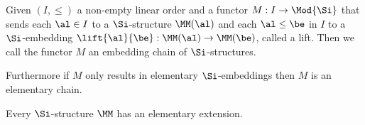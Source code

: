\begin{dfn}
    Given $(I,\leq)$ a non-empty linear order and a functor $M: I \to \Mod{\Si}$
    that sends each $\al \in I$ to a $\Si$-structure $\MM(\al)$
    and each $\al \leq \be$ in $I$ to a 
    $\Si$-embedding $\lift{\al}{\be} : \MM(\al) \to \MM(\be)$, called a lift.
    Then we call the functor $M$ an embedding chain of $\Si$-structures.

    Furthermore if $M$ only results in elementary $\Si$-embeddings
    then $M$ is an elementary chain.
\end{dfn}

\begin{prop}
    Every $\Si$-structure $\MM$ has an 
     elementary extension.
\end{prop}
